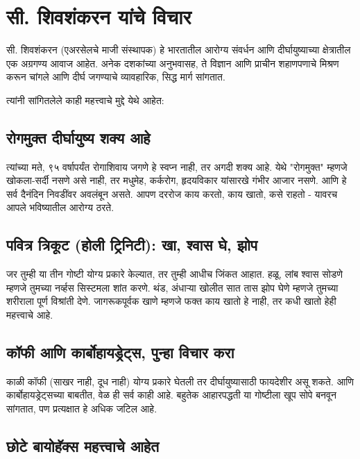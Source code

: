 \chapter*{सी. शिवशंकरन  यांचे विचार }

सी. शिवशंकरन (एअरसेलचे माजी संस्थापक) हे भारतातील आरोग्य संवर्धन आणि दीर्घायुष्याच्या क्षेत्रातील एक अग्रगण्य आवाज आहेत. अनेक दशकांच्या अनुभवासह, ते विज्ञान आणि प्राचीन शहाणपणाचे मिश्रण करून चांगले आणि दीर्घ जगण्याचे व्यावहारिक, सिद्ध मार्ग सांगतात.

त्यांनी सांगितलेले काही महत्त्वाचे मुद्दे येथे आहेत:

\section*{रोगमुक्त दीर्घायुष्य शक्य आहे}

त्यांच्या मते, ९५ वर्षापर्यंत रोगाशिवाय जगणे हे स्वप्न नाही, तर अगदी शक्य आहे. येथे "रोगमुक्त" म्हणजे खोकला-सर्दी नसणे असे नाही, तर मधुमेह, कर्करोग, हृदयविकार यांसारखे गंभीर आजार नसणे. आणि हे सर्व दैनंदिन निवडींवर अवलंबून असते. आपण दररोज काय करतो, काय खातो, कसे राहतो - यावरच आपले भविष्यातील आरोग्य ठरते.

\section*{पवित्र त्रिकूट (होली ट्रिनिटी): खा, श्वास घे, झोप}

जर तुम्ही या तीन गोष्टी योग्य प्रकारे केल्यात, तर तुम्ही आधीच जिंकत आहात. हळू, लांब श्वास सोडणे म्हणजे तुमच्या नर्व्हस सिस्टमला शांत करणे. थंड, अंधाऱ्या खोलीत सात तास झोप घेणे म्हणजे तुमच्या शरीराला पूर्ण विश्रांती देणे. जागरूकपूर्वक खाणे म्हणजे फक्त काय खातो हे नाही, तर कधी खातो हेही महत्त्वाचे आहे.

\section*{कॉफी आणि कार्बोहायड्रेट्स, पुन्हा विचार करा}

काळी कॉफी (साखर नाही, दूध नाही) योग्य प्रकारे घेतली तर दीर्घायुष्यासाठी फायदेशीर असू शकते. आणि कार्बोहायड्रेट्सच्या बाबतीत, वेळ ही सर्व काही आहे. बहुतेक आहारपद्धती या गोष्टीला खूप सोपे बनवून सांगतात, पण प्रत्यक्षात हे अधिक जटिल आहे.

\section*{छोटे बायोहॅक्स महत्त्वाचे आहेत}

